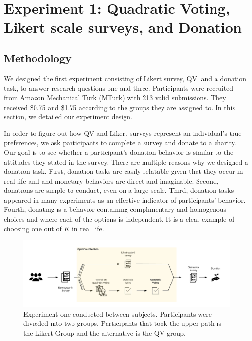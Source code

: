 \section{Experiment 1: Quadratic Voting, Likert scale surveys, and Donation}
\subsection{Methodology} \label{method-1}
We designed the first experiment 
consisting of Likert survey, QV, and a donation task,
to answer research questions one and three. 
Participants were recruited from Amazon Mechanical Turk (MTurk)
with 213 valid submissions. %
They received \$0.75 and \$1.75 according to the groups they are assigned to.
In this section, 
we detailed our experiment design.

In order to figure out 
how QV and Likert surveys 
represent an individual's true preferences,
we ask participants to complete a survey
and donate to a charity.
Our goal is to see 
whether a participant's donation behavior is similar to 
the attitudes they stated in the survey.
There are multiple reasons
why we designed a donation task.
First, donation tasks are easily relatable
given that they occur in real life and
and monetary behaviors are direct and imaginable.
Second, donations are simple to conduct,
even on a large scale.
Third, donation tasks appeared in many experiments 
\cite{Xiao2019, benz2008people, gendall2010effect} 
as an effective indicator of participants' behavior.
Fourth, donating is a behavior containing
complimentary and homogenous choices and
where each of the options is independent.
It is a clear example of choosing one out of $K$ in real life.

\begin{figure}[htpb]
    \centering
    \includegraphics[width=\textwidth, keepaspectratio=true]{content/image/exp1_flow.png}
    \caption{
        Experiment one conducted between subjects. Participants were divieded into two groups. Participants that took the upper path is the Likert Group and the alternative is the QV group.
    }
    \label{fig:exp1_image_flow}
\end{figure}

